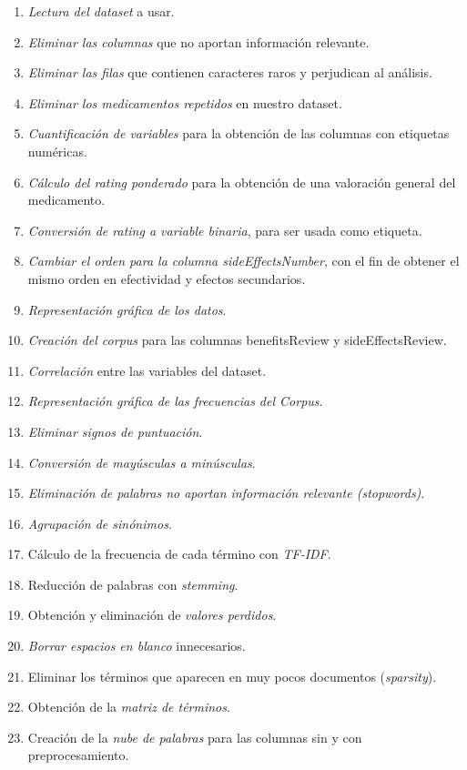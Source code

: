 \documentclass[spanish,]{article}
\providecommand{\tightlist}{%
  \setlength{\itemsep}{0pt}\setlength{\parskip}{0pt}}
\begin{document}
\begin{enumerate}
\def\labelenumi{\arabic{enumi}.}
\tightlist
\item
  \emph{Lectura del dataset} a usar.
\item
  \emph{Eliminar las columnas} que no aportan información relevante.
\item
  \emph{Eliminar las filas} que contienen caracteres raros y perjudican
  al análisis.
\item
  \emph{Eliminar los medicamentos repetidos} en nuestro dataset.
\item
  \emph{Cuantificación de variables} para la obtención de las columnas
  con etiquetas numéricas.
\item
  \emph{Cálculo del rating ponderado} para la obtención de una
  valoración general del medicamento.
\item
  \emph{Conversión de rating a variable binaria}, para ser usada como
  etiqueta.
\item
  \emph{Cambiar el orden para la columna sideEffectsNumber}, con el fin
  de obtener el mismo orden en efectividad y efectos secundarios.
\item
  \emph{Representación gráfica de los datos}.
\item
  \emph{Creación del corpus} para las columnas benefitsReview y
  sideEffectsReview.
\item
  \emph{Correlación} entre las variables del dataset.
\item
  \emph{Representación gráfica de las frecuencias del Corpus}.
\item
  \emph{Eliminar signos de puntuación}.
\item
  \emph{Conversión de mayúsculas a minúsculas}.
\item
  \emph{Eliminación de palabras no aportan información relevante
  (stopwords)}.
\item
  \emph{Agrupación de sinónimos}.
\item
  Cálculo de la frecuencia de cada término con \emph{TF-IDF}.
\item
  Reducción de palabras con \emph{stemming}.
\item
  Obtención y eliminación de \emph{valores perdidos}.
\item
  \emph{Borrar espacios en blanco} innecesarios.
\item
  Eliminar los términos que aparecen en muy pocos documentos
  (\emph{sparsity}).
\item
  Obtención de la \emph{matriz de términos}.
\item
  Creación de la \emph{nube de palabras} para las columnas sin y con
  preprocesamiento.
\end{enumerate}
\end{document}
